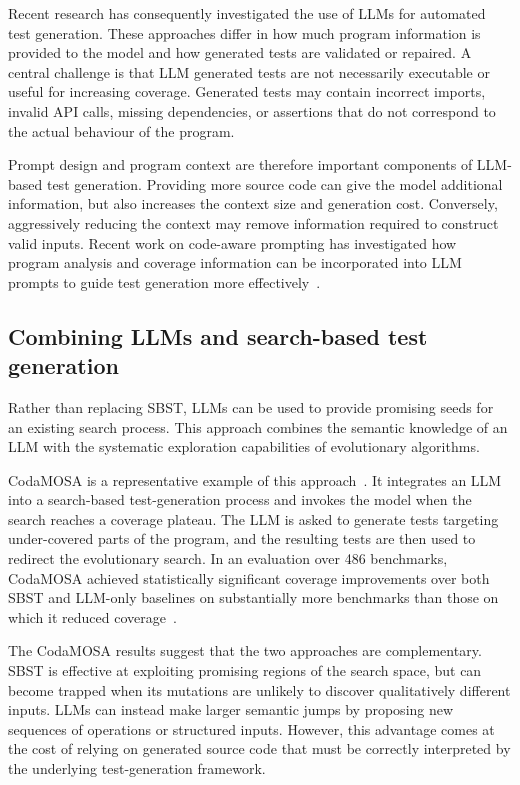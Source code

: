\documentclass{article}
\begin{document}
Recent research has consequently investigated the use of LLMs for automated test generation. These approaches differ in how much program information is provided to the model and how generated tests are validated or repaired. A central challenge is that LLM generated tests are not necessarily executable or useful for increasing coverage. Generated tests may contain incorrect imports, invalid API calls, missing dependencies, or assertions that do not correspond to the actual behaviour of the program.

Prompt design and program context are therefore important components of LLM-based test generation. Providing more source code can give the model additional information, but also increases the context size and generation cost. Conversely, aggressively reducing the context may remove information required to construct valid inputs. Recent work on code-aware prompting has investigated how program analysis and coverage information can be incorporated into LLM prompts to guide test generation more effectively~\cite{ryan2024codeawarepromptingstudycoverage}.

\subsection{Combining LLMs and search-based test generation}
Rather than replacing SBST, LLMs can be used to provide promising seeds for an existing search process. This approach combines the semantic knowledge of an LLM with the systematic exploration capabilities of evolutionary algorithms.

CodaMOSA is a representative example of this approach~\cite{10172800}. It integrates an LLM into a search-based test-generation process and invokes the model when the search reaches a coverage plateau. The LLM is asked to generate tests targeting under-covered parts of the program, and the resulting tests are then used to redirect the evolutionary search. In an evaluation over 486 benchmarks, CodaMOSA achieved statistically significant coverage improvements over both SBST and LLM-only baselines on substantially more benchmarks than those on which it reduced coverage~\cite{10172800}.

The CodaMOSA results suggest that the two approaches are complementary. SBST is effective at exploiting promising regions of the search space, but can become trapped when its mutations are unlikely to discover qualitatively different inputs. LLMs can instead make larger semantic jumps by proposing new sequences of operations or structured inputs. However, this advantage comes at the cost of relying on generated source code that must be correctly interpreted by the underlying test-generation framework.
\end{document}
